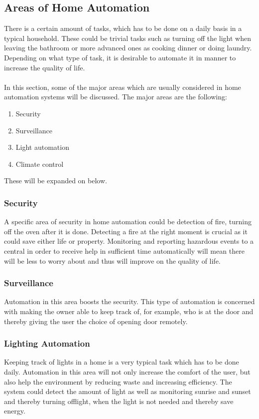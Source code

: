 \subsection{Areas of Home Automation}
\label{sec:Areas of Home Automation}
There is a certain amount of tasks, which has to be done on a daily basis in a typical household. These could be trivial tasks such as turning off the light when leaving the bathroom or more advanced ones as cooking dinner or doing laundry. Depending on what type of task, it is desirable to automate it in manner to increase the quality of life.
\\\\
In this section, some of the major areas which are usually considered in home automation systems will be discussed.
The major areas are the following:
\begin{enumerate}
  \item Security
  \item Surveillance
  \item Light automation
  \item Climate control
\end{enumerate}
These will be expanded on below.

\subsubsection{Security}
\label{sub:Security}
A specific area of security in home automation could be detection of fire, turning off the oven after it is done. Detecting a fire at the right moment is crucial as it could save either life or property. Monitoring and reporting hazardous events to a central in order to receive help in sufficient time automatically will mean there will be less to worry about and thus will improve on the quality of life.

\subsubsection{Surveillance}
\label{sub:Surveillance}
Automation in this area boosts the security. This type of automation is concerned with making the owner able to keep track of, for example, who is at the door and thereby giving the user the choice of opening door remotely.

\subsubsection{Lighting Automation}
\label{sub:Lighting Automation}
Keeping track of lights in a home is a very typical task which has to be done daily. Automation in this area will not only increase the comfort of the user, but also help the environment by reducing waste and increasing efficiency. The system could detect the amount of light as well as monitoring sunrise and sunset and thereby turning offlight, when the light is not needed and thereby save energy.

